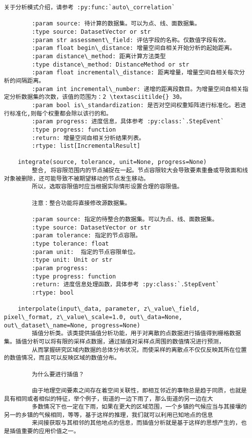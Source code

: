 \documentclass[11pt]{article}
\begin{document}
\begin{Verbatim}[commandchars=\\\{\}]
        关于分析模式介绍，请参考 :py:func:`auto\_correlation`
        
        :param source: 待计算的数据集。可以为点、线、面数据集。
        :type source: DatasetVector or str
        :param str assessment\_field: 评估字段的名称。仅数值字段有效。
        :param float begin\_distance: 增量空间自相关开始分析的起始距离。
        :param distance\_method: 距离计算方法类型
        :type distance\_method: DistanceMethod or str
        :param float incremental\_distance: 距离增量，增量空间自相关每次分析的间隔距离。
        :param int incremental\_number: 递增的距离段数目。为增量空间自相关指定分析数据集的次数，该值的范围为：2 \textasciitilde{} 30。
        :param bool is\_standardization: 是否对空间权重矩阵进行标准化。若进行标准化,则每个权重都会除以该行的和。
        :param progress: 进度信息，具体参考 :py:class:`.StepEvent`
        :type progress: function
        :return: 增量空间自相关分析结果列表。
        :rtype: list[IncrementalResult]
    
    integrate(source, tolerance, unit=None, progress=None)
        整合, 将容限范围内的节点捕捉在一起。节点容限较大会导致要素重叠或导致面和线对象被删除，还可能导致不被期望移动的节点发生移动。
        所以，选取容限值时应当根据实际情形设置合理的容限值。
        
        注意：整合功能将直接修改源数据集。
        
        :param source: 指定的待整合的数据集。可以为点、线、面数据集。
        :type source: DatasetVector or str
        :param tolerance: 指定的节点容限。
        :type tolerance: float
        :param unit:  指定的节点容限单位。
        :type unit: Unit or str
        :param progress:
        :type progress: function
        :return: 进度信息处理函数，具体参考 :py:class:`.StepEvent`
        :rtype: bool
    
    interpolate(input\_data, parameter, z\_value\_field, pixel\_format, z\_value\_scale=1.0, out\_data=None, out\_dataset\_name=None, progress=None)
        插值分析类。该类提供插值分析功能，用于对离散的点数据进行插值得到栅格数据集。插值分析可以将有限的采样点数据，通过插值对采样点周围的数值情况进行预测，
        从而掌握研究区域内数据的总体分布状况，而使采样的离散点不仅仅反映其所在位置的数值情况，而且可以反映区域的数值分布。
        
        为什么要进行插值？
        
        由于地理空间要素之间存在着空间关联性，即相互邻近的事物总是趋于同质，也就是具有相同或者相似的特征，举个例子，街道的一边下雨了，那么街道的另一边在大
        多数情况下也一定在下雨，如果在更大的区域范围，一个乡镇的气候应当与其接壤的另一的乡镇的气候相同，等等，基于这样的推理，我们就可以利用已知地点的信息
        来间接获取与其相邻的其他地点的信息，而插值分析就是基于这样的思想产生的，也是插值重要的应用价值之一。
        

\end{Verbatim}
\end{document}
